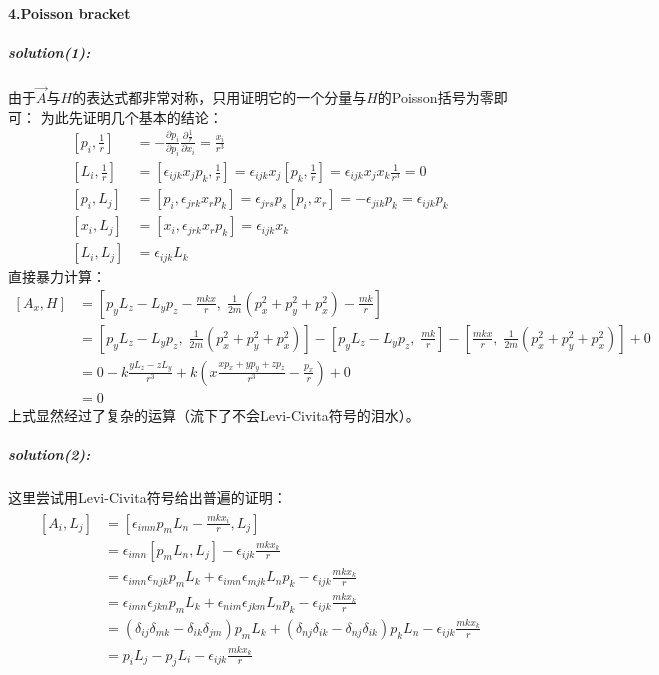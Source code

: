 \documentclass[a4paper]{ctexart}
\begin{document}
    \paragraph{4.Poisson bracket}
    \subparagraph{solution(1):}
    由于$\vec{A}$与$H$的表达式都非常对称，只用证明它的一个分量与$H$的Poisson括号为零即可：
    为此先证明几个基本的结论：
    \begin{align}
        \left[p_{i}, \frac{1}{r}\right] &= -\frac{\partial p_{i}}{\partial p_{i}}\frac{\partial \frac{1}{r}}{\partial x_{i}} = \frac{x_{i}}{r^{3}}\\
        \left[L_{i}, \frac{1}{r}\right] &= \left[\epsilon_{ijk}x_{j}p_{k}, \frac{1}{r}\right] = \epsilon_{ijk}x_{j}\left[p_{k}, \frac{1}{r}\right] = \epsilon_{ijk}x_{j}x_{k}\frac{1}{r^{3}} = 0\\
        \left[p_{i}, L_{j}\right] &= \left[p_{i}, \epsilon_{jrk}x_{r}p_{k}\right] = \epsilon_{jrs}p_{s}\left[p_{i}, x_{r}\right] = -\epsilon_{jik}p_{k} = \epsilon_{ijk}p_{k}\\
        \left[x_{i}, L_{j}\right] &= \left[x_{i}, \epsilon_{jrk}x_{r}p_{k}\right] = \epsilon_{ijk}x_{k}\\
        \left[L_{i}, L_{j}\right] &= \epsilon_{ijk}L_{k}
    \end{align}
    直接暴力计算：
    \begin{align}
        \left[A_{x}, H\right] &= \left[p_{y}L_{z} - L_{y}p_{z} - \frac{mkx}{r},\; \frac{1}{2m}(p_{x}^{2} + p_{y}^{2}+p_{x}^{2}) - \frac{mk}{r}\right]\\
        &= \left[p_{y}L_{z} - L_{y}p_{z}, \;\frac{1}{2m}(p_{x}^{2} + p_{y}^{2}+p_{x}^{2})\right] - \left[p_{y}L_{z}-L_{y}p_{z},\;\frac{mk}{r}\right] - \left[\frac{mkx}{r},\;\frac{1}{2m}(p_{x}^{2} + p_{y}^{2}+p_{x}^{2})\right] + 0\\
        &= 0 - k\frac{yL_{z} - zL_{y}}{r^{3}} + k\left(x\frac{xp_{x} + yp_{y} + zp_{z}}{r^{3}} - \frac{p_{x}}{r}\right) + 0\\
        &=0
    \end{align}
    上式显然经过了复杂的运算（流下了不会Levi-Civita符号的泪水）。
    \subparagraph{solution(2):}
    这里尝试用Levi-Civita符号给出普遍的证明：
    \begin{gather}
        \begin{align}
        \left[A_{i}, L_{j}\right] &= \left[\epsilon_{imn}p_{m}L_{n} - \frac{mkx_{i}}{r}, L_{j}\right]\\
        &= \epsilon_{imn}\left[p_{m}L_{n}, L_{j}\right] - \epsilon_{ijk}\frac{mkx_{k}}{r}\\
        &= \epsilon_{imn}\epsilon_{njk}p_{m}L_{k} + \epsilon_{imn}\epsilon_{mjk}L_{n}p_{k} - \epsilon_{ijk}\frac{mkx_{k}}{r}\\
        &= \epsilon_{imn}\epsilon_{jkn}p_{m}L_{k} + \epsilon_{nim}\epsilon_{jkm}L_{n}p_{k} - \epsilon_{ijk}\frac{mkx_{k}}{r}\\
        &= (\delta_{ij}\delta_{mk}-\delta_{ik}\delta_{jm})p_{m}L_{k} + (\delta_{nj}\delta_{ik}- \delta_{nj}\delta_{ik})p_{k}L_{n} - \epsilon_{ijk}\frac{mkx_{k}}{r}\\
        &= p_{i}L_{j} - p_{j}L_{i} - \epsilon_{ijk}\frac{mkx_{k}}{r}
        \end{align}
    \end{gather}
\end{document}
